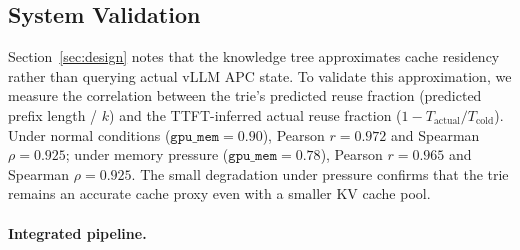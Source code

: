 \documentclass{article}
\begin{document}
\begin{table}[t]
\caption{End-to-end TTFT (ms) including retrieval latency (RTX 4090, 200 queries; workload generates 50 output tokens per request but TTFT excludes the 50-token decode).}
\label{tab:e2e}
\centering
\small
{}
\vspace{-0.5em}
\end{table}

\subsection{System Validation}
\label{sec:trie_valid}

Section~\ref{sec:design} notes that the knowledge tree approximates cache residency rather than querying actual vLLM APC state. To validate this approximation, we measure the correlation between the trie's predicted reuse fraction (predicted prefix length / $k$) and the TTFT-inferred actual reuse fraction ($1 - T_{\text{actual}} / T_{\text{cold}}$). Under normal conditions ($\texttt{gpu\_mem} = 0.90$), Pearson $r = 0.972$ and Spearman $\rho = 0.925$; under memory pressure ($\texttt{gpu\_mem} = 0.78$), Pearson $r = 0.965$ and Spearman $\rho = 0.925$. The small degradation under pressure confirms that the trie remains an accurate cache proxy even with a smaller KV cache pool.


\paragraph{Integrated pipeline.}
\label{sec:integrated}
\end{document}
